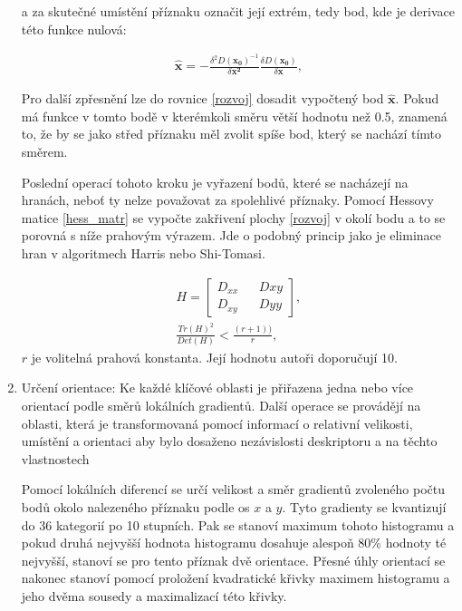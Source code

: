 \begin{enumerate}
			a za skutečné umístění příznaku označit její extrém, tedy bod, kde je derivace této funkce nulová:
			
			\begin{align}
			\mathbf{\hat{x}} = - \frac{\delta{}^2 D(\mathbf{x_0})^{-1}}{\delta{}\mathbf{x^2}}
			\frac{\delta D(\mathbf{x_0})}{\delta \mathbf{x}},
			\end{align}
			
			Pro další zpřesnění lze do rovnice \ref{rozvoj} dosadit vypočtený bod $\hat{\mathbf{x}}$. Pokud má funkce v tomto bodě v kterémkoli směru větší hodnotu než 0.5, znamená to, že by se jako střed příznaku měl zvolit spíše bod, který se nachází tímto směrem.
			
			Poslední operací tohoto kroku je vyřazení bodů, které se nacházejí na hranách, neboť ty nelze považovat za spolehlivé příznaky. Pomocí Hessovy matice \ref{hess_matr} se vypočte zakřivení plochy \ref{rozvoj} v okolí bodu a to se porovná s níže prahovým výrazem. Jde o podobný princip jako je eliminace hran v algoritmech Harris nebo Shi-Tomasi.
			
			\begin{align}
			\label{hess_matr}
			H = \begin{bmatrix}
			D_{xx} && D{xy} \\
			D_{xy} && D{yy}
			\end{bmatrix},\\
			\frac{Tr(H)^2}{Det(H)} < \frac{(r+1))}{r},
			\end{align}
			$r$ je volitelná prahová konstanta. Její hodnotu  autoři \cite{lowe2004distinctive} doporučují 10.
			
								
		\item Určení orientace: Ke každé klíčové oblasti je přiřazena jedna nebo více orientací podle směrů lokálních gradientů. Další operace se provádějí na oblasti, která je transformovaná pomocí informací o relativní velikosti, umístění a orientaci aby bylo dosaženo nezávislosti deskriptoru a na těchto  vlastnostech
		
			Pomocí lokálních diferencí se určí velikost a směr gradientů zvoleného počtu bodů okolo nalezeného příznaku podle os $x$ a $y$. Tyto gradienty se kvantizují do 36 kategorií po 10 stupních. Pak se stanoví maximum tohoto histogramu a pokud druhá nejvyšší hodnota histogramu dosahuje alespoň 80\% hodnoty té nejvyšší, stanoví se pro tento příznak dvě orientace. Přesné úhly orientací se nakonec stanoví pomocí proložení kvadratické křivky maximem histogramu a jeho dvěma sousedy a maximalizací této křivky.	
					

\end{enumerate}
